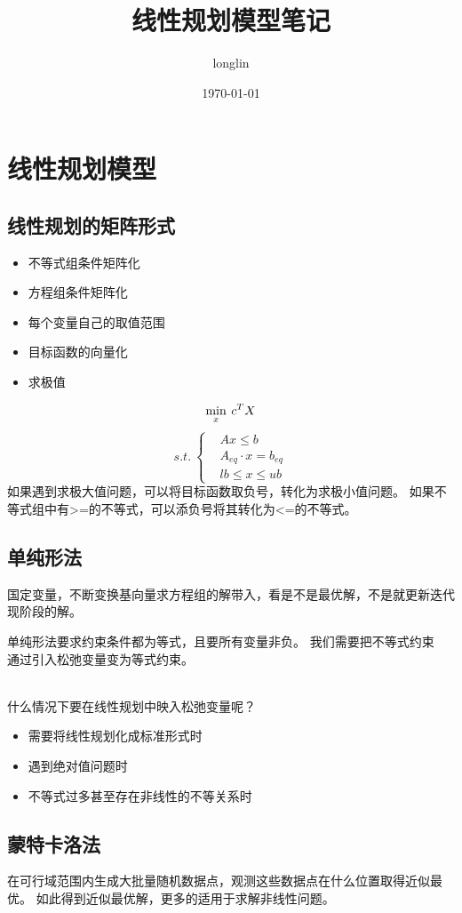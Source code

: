 \documentclass[12pt,a4paper]{article}
\title{线性规划模型笔记}
\author{longlin}
\date{\today}
\begin{document}
\maketitle

\section{线性规划模型}
\subsection{线性规划的矩阵形式}
\begin{itemize}
    \item 不等式组条件矩阵化
    \item 方程组条件矩阵化
    \item 每个变量自己的取值范围
    \item 目标函数的向量化
    \item 求极值
\end{itemize}

$$
\min_x \: c^T X \\
$$
\begin{equation}
    s.t. \:
    \begin{cases}
        & Ax \leq b \\
        & A_{eq} \cdot x = b_{eq} \\
        & lb \leq x \leq ub
    \end{cases}
\end{equation}
如果遇到求极大值问题，可以将目标函数取负号，转化为求极小值问题。
如果不等式组中有>=的不等式，可以添负号将其转化为<=的不等式。

\subsection{单纯形法}
国定变量，不断变换基向量求方程组的解带入，看是不是最优解，不是就更新迭代现阶段的解。

单纯形法要求约束条件都为等式，且要所有变量非负。
我们需要把不等式约束$\textbf{通过引入松弛变量变为等式约束}$。

\\
什么情况下要在线性规划中映入松弛变量呢？
\begin{itemize}
    \item 需要将线性规划化成标准形式时
    \item 遇到绝对值问题时
    \item 不等式过多甚至存在非线性的不等关系时
\end{itemize}
\subsection{蒙特卡洛法}
在$\textbf{可行域范围内生成大批量随机数据点}$，观测这些数据点在什么位置取得近似最优。
如此得到近似最优解，更多的适用于求解非线性问题。
\end{document}
